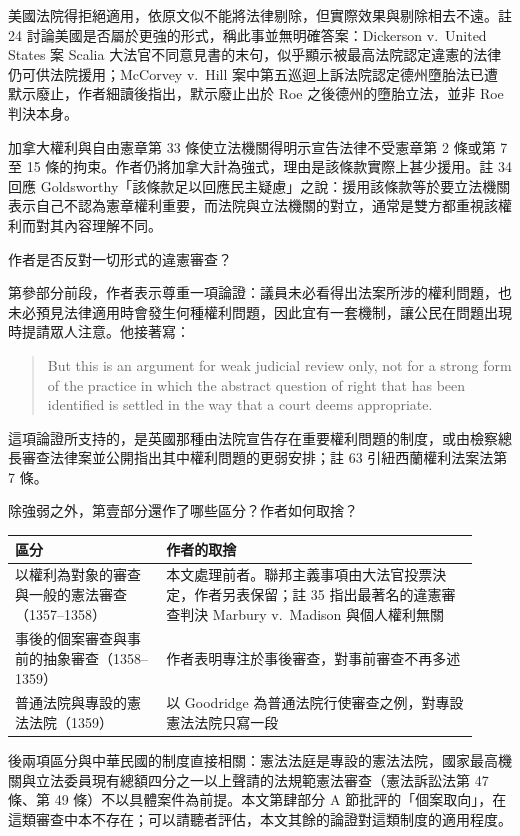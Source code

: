 美國法院得拒絕適用，依原文似不能將法律剔除，但實際效果與剔除相去不遠。註 24 討論美國是否屬於更強的形式，稱此事並無明確答案：Dickerson v.\ United States 案 Scalia 大法官不同意見書的末句，似乎顯示被最高法院認定違憲的法律仍可供法院援用；McCorvey v.\ Hill 案中第五巡迴上訴法院認定德州墮胎法已遭默示廢止，作者細讀後指出，默示廢止出於 Roe 之後德州的墮胎立法，並非 Roe 判決本身。

加拿大權利與自由憲章第 33 條使立法機關得明示宣告法律不受憲章第 2 條或第 7 至 15 條的拘束。作者仍將加拿大計為強式，理由是該條款實際上甚少援用。註 34 回應 Goldsworthy「該條款足以回應民主疑慮」之說：援用該條款等於要立法機關表示自己不認為憲章權利重要，而法院與立法機關的對立，通常是雙方都重視該權利而對其內容理解不同。


\begin{qaquestion}
作者是否反對一切形式的違憲審查？
\end{qaquestion}

第參部分前段，作者表示尊重一項論證：議員未必看得出法案所涉的權利問題，也未必預見法律適用時會發生何種權利問題，因此宜有一套機制，讓公民在問題出現時提請眾人注意。他接著寫：

\begin{quote}
But this is an argument for weak judicial review only, not for a strong form of the practice in which the abstract question of right that has been identified is settled in the way that a court deems appropriate.
\end{quote}

這項論證所支持的，是英國那種由法院宣告存在重要權利問題的制度，或由檢察總長審查法律案並公開指出其中權利問題的更弱安排；註 63 引紐西蘭權利法案法第 7 條。


\begin{qaquestion}
除強弱之外，第壹部分還作了哪些區分？作者如何取捨？
\end{qaquestion}

\begin{longtable}{@{}L{0.30\linewidth}L{0.62\linewidth}@{}}
\toprule
區分 & 作者的取捨 \\
\midrule
\endhead
以權利為對象的審查與一般的憲法審查（1357--1358） & 本文處理前者。聯邦主義事項由大法官投票決定，作者另表保留；註 35 指出最著名的違憲審查判決 Marbury v.\ Madison 與個人權利無關 \\
事後的個案審查與事前的抽象審查（1358--1359） & 作者表明專注於事後審查，對事前審查不再多述 \\
普通法院與專設的憲法法院（1359） & 以 Goodridge 為普通法院行使審查之例，對專設憲法法院只寫一段 \\
\bottomrule
\end{longtable}

\begin{readernote}
後兩項區分與中華民國的制度直接相關：憲法法庭是專設的憲法法院，國家最高機關與立法委員現有總額四分之一以上聲請的法規範憲法審查（憲法訴訟法第 47 條、第 49 條）不以具體案件為前提。本文第肆部分 A 節批評的「個案取向」，在這類審查中本不存在；可以請聽者評估，本文其餘的論證對這類制度的適用程度。
\end{readernote}
